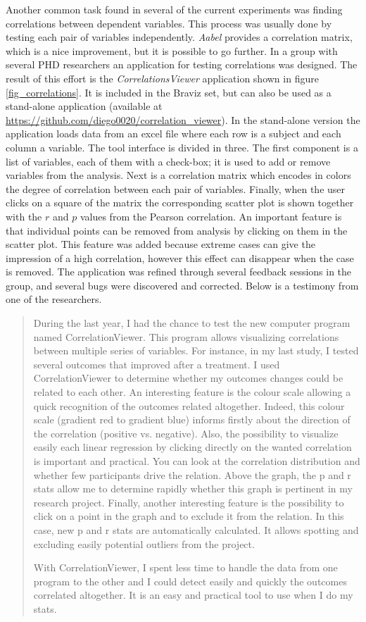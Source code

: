 Another common task found in several of the current experiments was finding correlations between dependent variables. This process was usually done by testing each pair of variables independently. \emph{Aabel} provides a correlation matrix, which is a nice improvement, but it is possible to go further. In a group with several PHD researchers an application for testing correlations was designed. The result of this effort is the \emph{CorrelationsViewer} application shown in figure \ref{fig_correlations}. It is included in the Braviz set, but can also be used as a stand-alone application (available at \url{https://github.com/diego0020/correlation_viewer}). In the stand-alone version the application loads data from an excel file where each row is a subject and each column a variable. The tool interface is divided in three. The first component is a list of variables, each of them with a check-box; it is used to add or remove variables from the analysis. Next is a correlation matrix which encodes in colors the degree of correlation between each pair of variables. Finally, when the user clicks on a square of the matrix the corresponding scatter plot is shown together with the $r$ and $p$ values from the Pearson correlation. An important feature is that individual points can be removed from analysis by clicking on them in the scatter plot. This feature was added because extreme cases can give the impression of a high correlation, however this effect can disappear when the case is removed. The application was refined through several feedback sessions in the group, and several bugs were discovered and corrected.  Below is a testimony from one of the researchers.

\begin{quote}
During the last year, I had the chance to test the new computer program named CorrelationViewer. This program allows visualizing correlations between multiple series of variables. For instance, in my last study, I tested several outcomes that improved after a treatment. I used CorrelationViewer to determine whether my outcomes changes could be related to each other. An interesting feature is the colour scale allowing a quick recognition of the outcomes related altogether. Indeed, this colour scale (gradient red to gradient blue) informs firstly about the direction of the correlation (positive vs. negative). Also, the possibility to visualize easily each linear regression by clicking directly on the wanted correlation is important and practical. You can look at the correlation distribution and whether few participants drive the relation. Above the graph, the p and r stats allow me to determine rapidly whether this graph is pertinent in my research project. Finally, another interesting feature is the possibility to click on a point in the graph and to exclude it from the relation. In this case, new p and r stats are automatically calculated. It allows spotting and excluding easily potential outliers from the project.

With CorrelationViewer, I spent less time to handle the data from one program to the other and I could detect easily and quickly the outcomes correlated altogether. It is an easy and practical tool to use when I do my stats. 
\end{quote}

